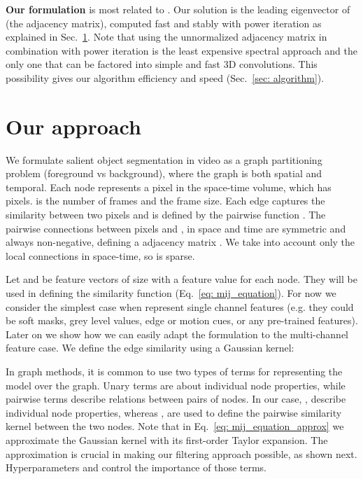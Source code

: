 \documentclass{article}
\begin{document}
\textbf{Our formulation} is most related to \cite{marius_iccv2005,meila_shi}. Our solution is the leading eigenvector of  (the adjacency matrix), computed fast and stably with power iteration as explained in Sec.~\ref{sec: math_formulation}. Note that using the unnormalized adjacency matrix in combination with power iteration is the least expensive spectral approach and the only one that can be factored into simple and fast 3D convolutions. This possibility gives our algorithm efficiency and speed (Sec.~\ref{sec: algorithm}). 
 

\section{Our approach}
\label{sec: math_formulation}


We formulate salient object segmentation in video as a graph partitioning problem (foreground vs background), where the graph is both spatial and temporal. Each node  represents a pixel in the space-time volume, which has  pixels.  is the number of frames and  the frame size. Each edge captures the similarity between two pixels and is defined by the pairwise function . The pairwise connections between pixels  and , in space and time are symmetric and always non-negative, defining a  adjacency matrix . We take into account only the local connections in space-time, so  is sparse. 

Let  and  be feature vectors of size  with a feature value for each node. They will be used in defining the similarity function  (Eq.~\ref{eq: mij_equation}).
For now we consider the simplest case when  represent single channel features (e.g. they could be soft masks, grey level values, edge or motion cues, or any pre-trained features). Later on we show how we can easily adapt the formulation to the multi-channel feature case. We define the edge similarity  using a Gaussian kernel:





In graph methods, it is common to use two types of terms for representing the model over the graph. Unary terms are about individual node properties, while pairwise terms describe relations between pairs of nodes. In our case, ,  describe individual node properties, whereas ,  are used to define the pairwise similarity kernel between the two nodes. Note that in Eq.~\ref{eq: mij_equation_approx} we approximate the Gaussian kernel with its first-order Taylor expansion. The approximation is crucial in making our filtering approach possible, as shown next. Hyperparameters  and  control the importance of those terms.
\end{document}
